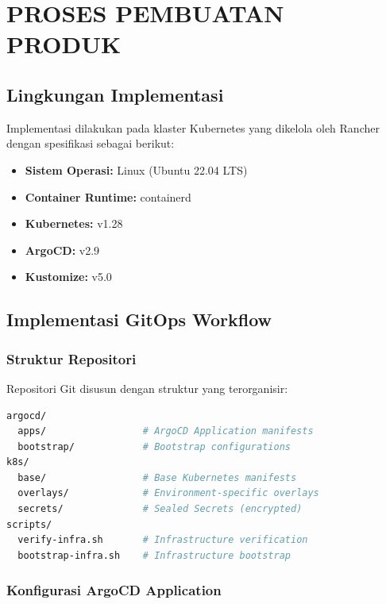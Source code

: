 \chapter{PROSES PEMBUATAN PRODUK}

\section{Lingkungan Implementasi}

Implementasi dilakukan pada klaster Kubernetes yang dikelola oleh Rancher dengan spesifikasi sebagai berikut:

\begin{itemize}
    \item \textbf{Sistem Operasi:} Linux (Ubuntu 22.04 LTS)
    \item \textbf{Container Runtime:} containerd
    \item \textbf{Kubernetes:} v1.28
    \item \textbf{ArgoCD:} v2.9
    \item \textbf{Kustomize:} v5.0
\end{itemize}

\section{Implementasi GitOps Workflow}

\subsection{Struktur Repositori}

Repositori Git disusun dengan struktur yang terorganisir:

\begin{lstlisting}[language=bash, caption={Struktur Repositori GitOps}]
argocd/
  apps/                 # ArgoCD Application manifests
  bootstrap/            # Bootstrap configurations
k8s/
  base/                 # Base Kubernetes manifests
  overlays/             # Environment-specific overlays
  secrets/              # Sealed Secrets (encrypted)
scripts/
  verify-infra.sh       # Infrastructure verification
  bootstrap-infra.sh    # Infrastructure bootstrap
\end{lstlisting}

\subsection{Konfigurasi ArgoCD Application}

